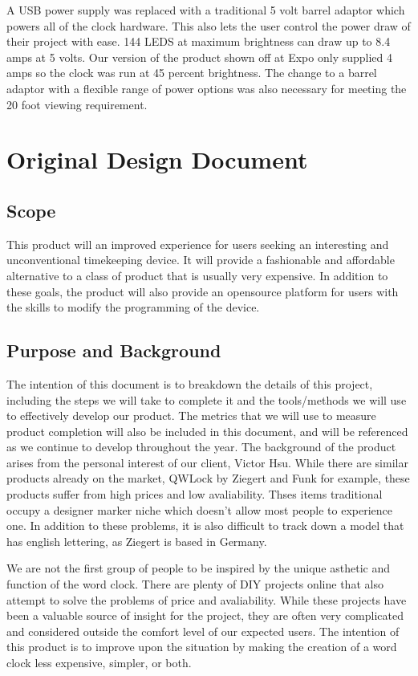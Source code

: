 \documentclass[onecolumn, draftclsnofoot,10pt, compsoc]{IEEEtran}
\begin{document}
A USB power supply was replaced with a traditional 5 volt barrel adaptor which powers all of the clock hardware. This also lets the user control the power draw of their project with ease. 144 LEDS at maximum brightness can draw up to 8.4 amps at 5 volts. Our version of the product shown off at Expo only supplied 4 amps so the clock was run at 45 percent brightness. The change to a barrel adaptor with a flexible range of power options was also necessary for meeting the 20 foot viewing requirement.


\section{Original Design Document}
\subsection{Scope}
This product will an improved experience for users seeking an interesting and unconventional timekeeping device.
It will provide a fashionable and affordable alternative to a class of product that is usually very expensive.
In addition to these goals, the product will also provide an opensource platform for users with the skills to modify the programming of the device.

\subsection{Purpose and Background}
The intention of this document is to breakdown the details of this project, including the steps we will take to complete it and the tools/methods we will use to effectively develop our product.
The metrics that we will use to measure product completion will also be included in this document, and will be referenced as we continue to develop throughout the year.
The background of the product arises from the personal interest of our client, Victor Hsu.
While there are similar products already on the market, QWLock by Ziegert and Funk for example, these products suffer from high prices and low avaliability.
Thses items traditional occupy a designer marker niche which doesn't allow most people to experience one.
In addition to these problems, it is also difficult to track down a model that has english lettering, as Ziegert is based in Germany.

We are not the first group of people to be inspired by the unique asthetic and function of the word clock.
There are plenty of DIY projects online that also attempt to solve the problems of price and avaliability.
While these projects have been a valuable source of insight for the project, they are often very complicated and considered outside the comfort level of our expected users.
The intention of this product is to improve upon the situation by making the creation of a word clock less expensive, simpler, or both.
\end{document}
